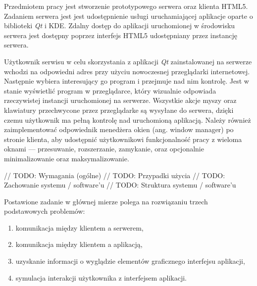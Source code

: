 Przedmiotem pracy jest stworzenie prototypowego serwera oraz klienta HTML5. Zadaniem serwera jest jest udostępnienie usługi uruchamiającej aplikacje oparte o biblioteki \emph{Qt} i KDE. Zdalny dostęp do aplikacji uruchomionej w środowisku serwera jest dostępny poprzez interfejs HTML5 udostępniany przez instancję serwera.

Użytkownik serwisu w celu skorzystania z aplikacji \emph{Qt} zainstalowanej na serwerze wchodzi na odpowiedni adres przy użyciu nowoczesnej przeglądarki internetowej. Następnie wybiera interesujący go program i przejmuje nad nim kontrolę. Jest w stanie wyświetlić program w przeglądarce, który wizualnie odpowiada rzeczywistej instancji uruchomionej na serwerze. Wszystkie akcje myszy oraz klawiatury przechwycone przez przeglądarke są wysyłane do serwera, dzięki czemu użytkownik ma pełną kontrolę nad uruchomioną aplikacją. Należy również zaimplementować odpowiednik menedżera okien (ang. window manager) po stronie klienta, aby udostępnić użytkownikowi funkcjonalność pracy z wieloma oknami --- przesuwanie, rozszerzanie, zamykanie, oraz opcjonalnie minimalizowanie oraz maksymalizowanie.

// TODO: Wymagania (ogólne)
// TODO: Przypadki użycia
// TODO: Zachowanie systemu / software'u
// TODO: Struktura systemu / software'u

Postawione zadanie w głównej mierze polega na rozwiązaniu trzech podstawowych problemów:
\begin{enumerate}
  \item komunikacja między klientem a serwerem,
  \item komunikacja między klientem a aplikacją,
  \item uzyskanie informacji o wyglądzie elementów graficznego interfejsu aplikacji,
  \item symulacja interakcji użytkownika z interfejsem aplikacji.
\end{enumerate}
